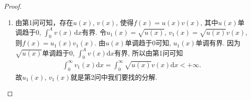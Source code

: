 \documentclass[../../main.tex]{subfiles}%
\begin{document}
\begin{proof}
\begin{enumerate}
\item 由第1问可知，存在$u(x)$, $v(x)$, 使得$f(x)=u(x)v(x)$, 其中$u(x)$单调趋于0, $\int_0^A v(x)\,\mathrm{d}x$有界. 令$u_1(x)=\sqrt{u(x)}$, $v_1(x)=\sqrt{u(x)}v(x)$, 则$f(x)=u_1(x)v_1(x)$. 由$u(x)$单调趋于0可知, $u_1(x)$单调有界. 因为$\sqrt{u(x)}$单调趋于0, $\int_0^A v(x)\mathrm{d}x$有界, 所以由第1问可知
\begin{align*}
\int_0^{\infty} v_1(x)\mathrm{d}x=\int_0^{\infty} \sqrt{u(x)}v(x)\mathrm{d}x<+\infty.
\end{align*}
故$u_1(x)$, $v_1(x)$就是第2问中我们要找的分解.
\end{enumerate}

\end{proof}
\end{document}
